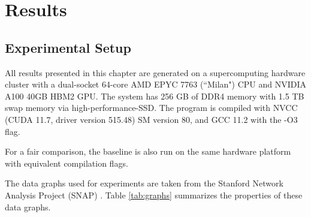 \chapter{Results}{\label{chap:Results}

\section{Experimental Setup} \label{sec:expt-info}
All results presented in this chapter are generated on a supercomputing hardware cluster with a dual-socket 64-core AMD EPYC 7763 (``Milan") CPU and NVIDIA A100 40GB HBM2 GPU.
The system has 256 GB of DDR4 memory with 1.5 TB swap memory via high-performance-SSD.
The program is compiled with NVCC (CUDA 11.7, driver version 515.48) SM version 80, and GCC 11.2 with the -O3 flag.

For a fair comparison, the baseline is also run on the same hardware platform with equivalent compilation flags.

The data graphs used for experiments are taken from the Stanford Network Analysis Project (SNAP) \cite{snap}.
Table \ref{tab:graphs} summarizes the properties of these data graphs.

}
